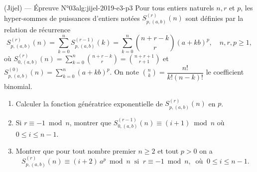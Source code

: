 \newpage

\begin{problem}{(Jijel) — Épreuve N°03}{alg:jijel-2019-e3-p3}
Pour tous entiers naturels $n, r$ et $p$, les hyper-sommes de puissances d'entiers
notées $S_{p,(a,b)}^{(r)}(n)$ sont définies par la relation de récurrence
$$
S_{p,(a,b)}^{(r)}(n) = \sum_{k=0}^{n} S_{p,(a,b)}^{(r-1)}(k)
= \sum_{k=0}^{n} \binom{n + r - k}{r} (a + kb)^p, \quad n, r, p \ge 1,
$$
où
$S_{0,(a,b)}^{(r)}(n) = \sum_{k=0}^{n} \binom{n + r - k}{r} = \binom{n + r + 1}{r + 1}$
et $S_{p,(a,b)}^{(0)}(n) = \sum_{k=0}^{n} (a + kb)^p$. On note
$\binom{n}{k} = \dfrac{n!}{k!(n-k)!}$ le coefficient binomial.
\begin{enumerate}
\item Calculer la fonction génératrice exponentielle de $S_{p,(a,b)}^{(r)}(n)$ en $p$.
\item Si $r \equiv -1 \bmod n$, montrer que
      $S_{0,(a,b)}^{(r-1)}(n) \equiv (i + 1) \bmod n$ où $0 \le i \le n - 1$.
\item Montrer que pour tout nombre premier $n \ge 2$ et tout $p > 0$ on a
      $$
      S_{p,(a,b)}^{(r)}(n) \equiv (i + 2)\,a^p \bmod n
      \ \text{ si } \ r \equiv -1 \bmod n, \ \text{ où } \ 0 \le i \le n - 1.
      $$
\end{enumerate}

\end{problem}
